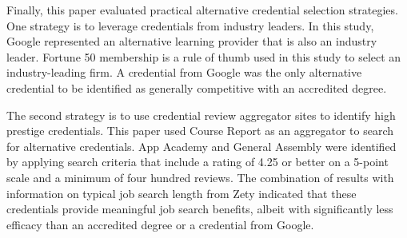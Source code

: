 Finally, this paper evaluated practical alternative credential selection strategies.
One strategy is to leverage credentials from industry leaders.
In this study, Google represented an alternative learning provider that is also an industry leader.
Fortune 50 membership is a rule of thumb used in this study to select an industry-leading firm.
A credential from Google was the only alternative credential to be identified as generally competitive with an accredited degree.

The second strategy is to use credential review aggregator sites to identify high prestige credentials.
This paper used Course Report as an aggregator to search for alternative credentials.
App Academy and General Assembly were identified by applying search criteria that include a rating of 4.25 or better on a 5-point scale and a minimum of four hundred reviews.
The combination of results with information on typical job search length from Zety indicated
that these credentials provide meaningful job search benefits,
albeit with significantly less efficacy than an accredited degree or a credential from Google.

